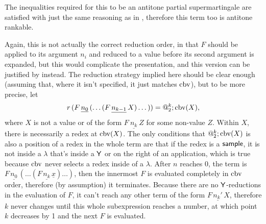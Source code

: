 The inequalities required for this to be an antitone partial supermartingale are satisfied with just the same reasoning as in , therefore this term too is antitone rankable.

Again, this is not actually the correct reduction order, in that $F$ should be applied to its argument $n_i$ and reduced to a value before its second argument is expanded, 
but this would complicate the presentation, and this version can be justified by  instead. 
The reduction strategy implied here should be clear enough (assuming that, where it isn't specified, it just matches $\operatorname{cbv}$), but to be more precise, 
let 
\[
r \, (F \, \underline{n_0} \, (\dots(F\, \underline {n_{k-1}}\, X)\dots)) = @_2^k;\operatorname{cbv}(X),
\] 
where $X$ is not a value or of the form $F\ \underline{n_k}\ Z$ for some non-value $Z$. 
Within $X$, there is necessarily a redex at $\operatorname{cbv}(X)$. 
The only conditions that $@_2^k;\operatorname{cbv}(X)$ is also a position of a redex in the whole term are that if the redex is a $\mathsf{sample}$, 
it is not inside a $\lambda$ that's inside a $\mathsf{Y}$ or on the right of an application, which is true because $\operatorname{cbv}$ never selects a redex inside of a $\lambda$. 
After $n$ reaches $0$, the term is $F \, \underline{n_0} \, (\dots(F\, \underline {n_k} \, \underline x)\dots)$, then the innermost $F$ is evaluated completely in $\operatorname{cbv}$ order, therefore (by assumption) it terminates. 
Because there are no $\mathsf{Y}$-reductions in the evaluation of $F$, it can't reach any other term of the form $F\, \underline{n_k'}\, X$, 
therefore $k$ never changes until this whole subexpression reaches a number, at which point $k$ decreases by 1 and the next $F$ is evaluated.

\iffalse
\antitoneSeemsComplete*

